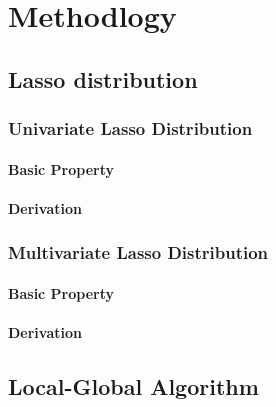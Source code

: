 \chapter{Methodlogy}
\label{Chapter3}

\section{Lasso distribution}
\subsection{Univariate Lasso Distribution}
\subsubsection{Basic Property}
\subsubsection{Derivation}

\subsection{Multivariate Lasso Distribution}
\subsubsection{Basic Property}
\subsubsection{Derivation}

\section{Local-Global Algorithm}

